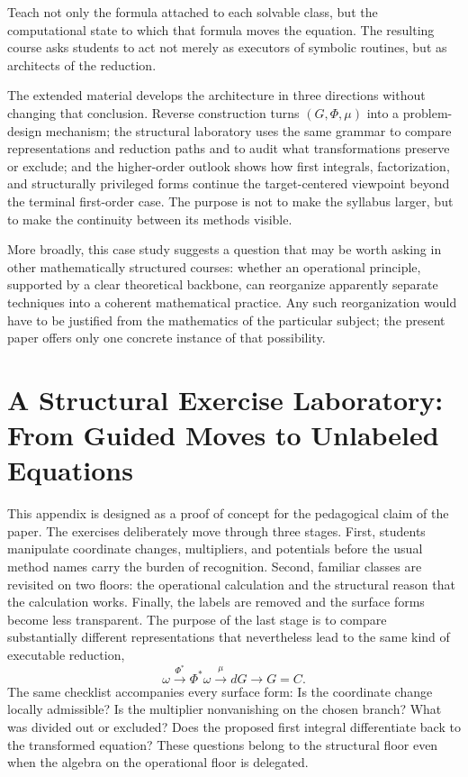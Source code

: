 \documentclass[11pt]{article}
\theoremstyle{definition}
\begin{document}
Teach not only the formula attached to each solvable class, but the computational state to which that formula moves the equation. The resulting course asks students to act not merely as executors of symbolic routines, but as architects of the reduction.

The extended material develops the architecture in three directions without changing that conclusion. Reverse construction turns \((G,\Phi,\mu)\) into a problem-design mechanism; the structural laboratory uses the same grammar to compare representations and reduction paths and to audit what transformations preserve or exclude; and the higher-order outlook shows how first integrals, factorization, and structurally privileged forms continue the target-centered viewpoint beyond the terminal first-order case. The purpose is not to make the syllabus larger, but to make the continuity between its methods visible.

More broadly, this case study suggests a question that may be worth asking in other mathematically structured courses: whether an operational principle, supported by a clear theoretical backbone, can reorganize apparently separate techniques into a coherent mathematical practice. Any such reorganization would have to be justified from the mathematics of the particular subject; the present paper offers only one concrete instance of that possibility.

\appendix
\section{A Structural Exercise Laboratory: From Guided Moves to Unlabeled Equations}
\label{app:lab}

This appendix is designed as a proof of concept for the pedagogical claim of the paper. The exercises deliberately move through three stages. First, students manipulate coordinate changes, multipliers, and potentials before the usual method names carry the burden of recognition. Second, familiar classes are revisited on two floors: the operational calculation and the structural reason that the calculation works. Finally, the labels are removed and the surface forms become less transparent. The purpose of the last stage is to compare substantially different representations that nevertheless lead to the same kind of executable reduction,
\[
\boxed{\omega\xrightarrow{\Phi^*}\Phi^*\omega
\xrightarrow{\mu}dG\longrightarrow G=C.}
\]
The same checklist accompanies every surface form: Is the coordinate change locally admissible? Is the multiplier nonvanishing on the chosen branch? What was divided out or excluded? Does the proposed first integral differentiate back to the transformed equation? These questions belong to the structural floor even when the algebra on the operational floor is delegated.
\end{document}
